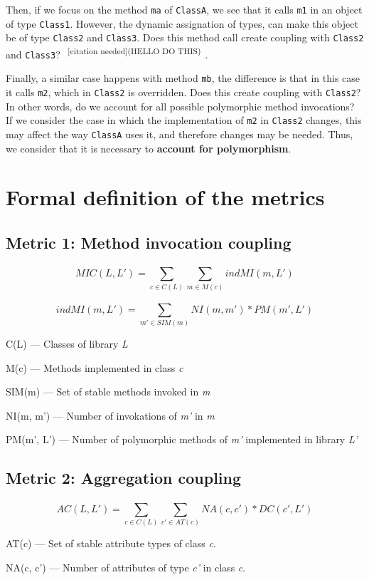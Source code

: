 \documentclass[a4paper]{article}
\newcommand{\cn}[1]{\textsuperscript{\color{red} ~[citation needed](#1)~}}
\begin{document}
Then, if we focus on the method \texttt{ma} of \texttt{ClassA}, we see that it calls \texttt{m1} in an object of type \texttt{Class1}. However, the dynamic assignation of types, can make this object be of type \texttt{Class2} and \texttt{Class3}. Does this method call create coupling with \texttt{Class2} and \texttt{Class3}? \cn{HELLO DO THIS}.

Finally, a similar case happens with method \texttt{mb}, the difference is that in this case it calls \texttt{m2}, which in \texttt{Class2} is overridden. Does this create coupling with \texttt{Class2}? In other words, do we account for all possible polymorphic method invocations? If we consider the case in which the implementation of \texttt{m2} in \texttt{Class2} changes, this may affect the way \texttt{ClassA} uses it, and therefore changes may be needed. Thus, we consider that it is necessary to \textbf{account for polymorphism}.

\section{Formal definition of the metrics}

\subsection{Metric 1: Method invocation coupling}
\[
  MIC(L, L') = \sum_{c \in C(L)}^{} \sum_{m \in M(c)}^{} indMI(m, L')
\]

\[
  indMI(m, L') = \sum_{m' \in SIM(m)}^{} NI(m, m')*PM(m', L')
\]

C(L) --- Classes of library \textit{L}

M(c) --- Methods implemented in class \textit{c}

SIM(m) --- Set of stable methods invoked in \textit{m}

NI(m, m') --- Number of invokations of \textit{m'} in \textit{m}

PM(m', L') --- Number of polymorphic methods of \textit{m'} implemented in library \textit{L'}

\subsection{Metric 2: Aggregation coupling}
\[
  AC(L,L') = \sum_{c \in C(L)}^{} \sum_{c' \in AT(c)}^{} NA(c, c')*DC(c', L')
\]

AT(c) --- Set of stable attribute types of class \textit{c}.

NA(c, c') --- Number of attributes of type \textit{c'} in class \textit{c}.
\end{document}
